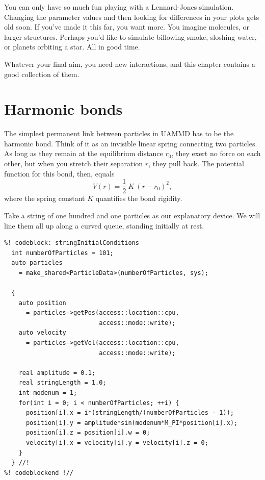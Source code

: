 
You can only have so much fun playing with a Lennard-Jones simulation. Changing
the parameter values and then looking for differences in your plots gets old
soon. If you've made it this far, you want more. You imagine molecules, or
larger structures. Perhaps you'd like to simulate billowing smoke, sloshing
water, or planets orbiting a star. All in good time.

Whatever your final aim, you need new interactions, and this chapter contains a
good collection of them.

\section{Harmonic bonds}

The simplest permanent link between particles in UAMMD has to be the harmonic
bond. Think of it as an invisible linear spring connecting two particles. As
long as they remain at the equilibrium distance $r_0$, they exert no force on
each other, but when you stretch their separation $r$, they pull back. The
potential function for this bond, then, equals
\begin{equation*}
  V(r) = \frac{1}{2}\ K\ (r - r_0)^2,
\end{equation*}
where the spring constant $K$ quantifies the bond rigidity.

Take a string of one hundred and one particles as our explanatory device. We
will line them all up along a curved queue, standing initially at rest.
\label{stringInitialConditions}
\begin{lstlisting}
%! codeblock: stringInitialConditions
  int numberOfParticles = 101;
  auto particles
    = make_shared<ParticleData>(numberOfParticles, sys);

  {
    auto position
      = particles->getPos(access::location::cpu,
                          access::mode::write);
    auto velocity
      = particles->getVel(access::location::cpu,
                          access::mode::write);

    real amplitude = 0.1;
    real stringLength = 1.0;
    int modenum = 1;
    for(int i = 0; i < numberOfParticles; ++i) {
      position[i].x = i*(stringLength/(numberOfParticles - 1));
      position[i].y = amplitude*sin(modenum*M_PI*position[i].x);
      position[i].z = position[i].w = 0;
      velocity[i].x = velocity[i].y = velocity[i].z = 0;
    }
  } //!
%! codeblockend !//
\end{lstlisting}

